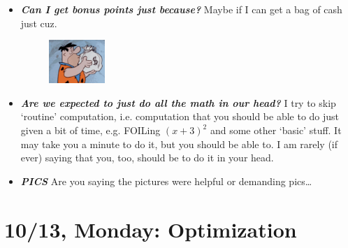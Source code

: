 \documentclass[11pt,letterpaper]{article}
\begin{document}
\begin{itemize}
\item {\bfseries\itshape Can I get bonus points just because?} Maybe if I can get a bag of cash just cuz.
	\begin{figure}[H]
	\centering
	\includegraphics[width=0.20\textwidth]{images/money.png}
	\end{figure}

\item {\bfseries\itshape Are we expected to just do all the math in our head? \Laughey} I try to skip `routine' computation, i.e. computation that you should be able to do just given a bit of time, e.g. FOILing $(x + 3)^2$ and some other `basic' stuff. It may take you a minute to do it, but you should be able to. I am rarely (if ever) saying that you, too, should be to do it in your head. 

\item {\bfseries\itshape PICS} Are you saying the pictures were helpful or demanding pics\dots
\end{itemize}

\newpage
\section*{10/13, Monday: Optimization\label{10-13}}
\end{document}
